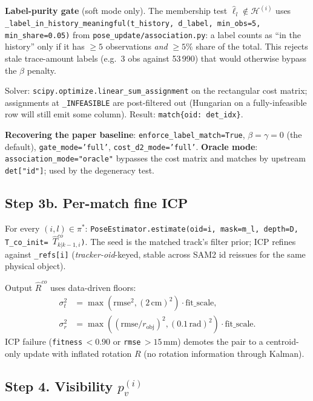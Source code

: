 \documentclass[11pt]{article}
\newcommand{\code}[1]{\texttt{\small #1}}
\begin{document}
\textbf{Label-purity gate} (soft mode only). The membership test
$\hat\ell_l\!\notin\!\mathcal H^{(i)}$ uses
\code{\_label\_in\_history\_meaningful(t\_history, d\_label, min\_obs=5,
min\_share=0.05)} from \code{pose\_update/association.py}: a label
counts as ``in the history'' only if it has $\ge 5$ observations
\emph{and} $\ge 5\%$ share of the total. This rejects stale
trace-amount labels (e.g.\ 3 obs against 53\,990) that would otherwise
bypass the $\beta$ penalty.

Solver: \code{scipy.optimize.linear\_sum\_assignment} on the
rectangular cost matrix; assignments at \code{\_INFEASIBLE} are
post-filtered out (Hungarian on a fully-infeasible row will still emit
some column). Result: \code{match\{oid: det\_idx\}}.

\textbf{Recovering the paper baseline}: \code{enforce\_label\_match=True},
$\beta=\gamma=0$ (the default), \code{gate\_mode='full'},
\code{cost\_d2\_mode='full'}. \textbf{Oracle mode}:
\code{association\_mode="oracle"} bypasses the cost matrix and matches
by upstream \code{det["id"]}; used by the degeneracy test.

\subsection{Step 3b. Per-match fine ICP}\label{sec:icp-fine}

For every $(i,l)\in\pi^*$:
\code{PoseEstimator.estimate(oid=i, mask=m\_l, depth=D, T\_co\_init=
\(\hat T^{co}_{k|k-1,i}\))}. The seed is the matched track's filter
prior; ICP refines against \code{\_refs[i]} (\emph{tracker-oid}-keyed,
stable across SAM2 id reissues for the same physical object).

Output $\hat R^{co}$ uses data-driven floors:
\begin{align*}
   \sigma^2_t &= \max(\text{rmse}^2,(2\,\text{cm})^2)\cdot\text{fit\_scale}, \\
   \sigma^2_r &= \max((\text{rmse}/r_{\text{obj}})^2,(0.1\,\text{rad})^2)\cdot\text{fit\_scale}.
\end{align*}
ICP failure (\code{fitness}\,$<\!0.90$ or \code{rmse}\,$>\!15$\,mm) demotes the pair to a centroid-only update with inflated rotation $R$ (no
rotation information through Kalman).

\subsection{Step 4. Visibility \texorpdfstring{$p_v^{(i)}$}{p\_v}}\label{sec:vis}
\end{document}
